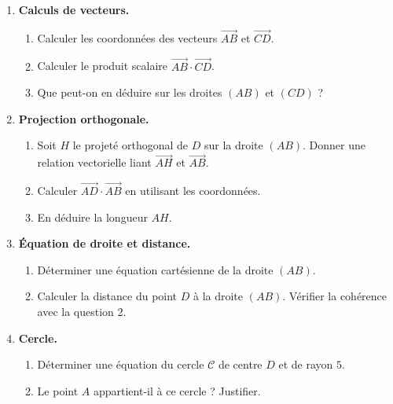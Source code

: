 \documentclass[a4paper,12pt]{article}
\begin{document}
\begin{enumerate}
\item \textbf{Calculs de vecteurs.}
\begin{enumerate}
\item Calculer les coordonnées des vecteurs $\overrightarrow{AB}$ et $\overrightarrow{CD}$.
\item Calculer le produit scalaire $\overrightarrow{AB} \cdot \overrightarrow{CD}$.
\item Que peut-on en déduire sur les droites $(AB)$ et $(CD)$ ?
\end{enumerate}

\item \textbf{Projection orthogonale.}
\begin{enumerate}
\item Soit $H$ le projeté orthogonal de $D$ sur la droite $(AB)$. Donner une relation vectorielle liant $\overrightarrow{AH}$ et $\overrightarrow{AB}$.
\item Calculer $\overrightarrow{AD} \cdot \overrightarrow{AB}$ en utilisant les coordonnées.
\item En déduire la longueur $AH$.
\end{enumerate}

\item \textbf{Équation de droite et distance.}
\begin{enumerate}
\item Déterminer une équation cartésienne de la droite $(AB)$.
\item Calculer la distance du point $D$ à la droite $(AB)$. Vérifier la cohérence avec la question 2.
\end{enumerate}

\item \textbf{Cercle.}
\begin{enumerate}
\item Déterminer une équation du cercle $\mathcal{C}$ de centre $D$ et de rayon $5$.
\item Le point $A$ appartient-il à ce cercle ? Justifier.
\end{enumerate}

\end{enumerate}
\end{document}
